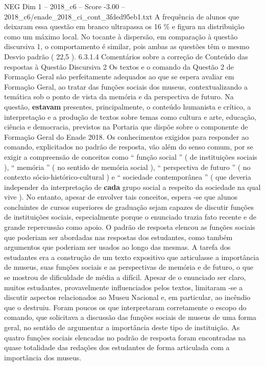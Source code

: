 \begin{textsample}{NEG Dim 1 – 2018\_c6 – Score -3.00 – 2018\_c6/enade\_2018\_ci\_cont\_3fded95eb1.txt}
A frequência de alunos que deixaram essa questão em branco ultrapassa os 16 \% e figura na distribuição como um máximo local.
No tocante à dispersão, em comparação à questão discursiva 1, o comportamento é similar, pois ambas as questões têm o mesmo Desvio padrão ( 22,5 ). 6.3.1.4 Comentários sobre a correção de Conteúdo das respostas à Questão Discursiva 2 Os textos e o comando da Questão 2 de Formação Geral são perfeitamente adequados ao que se espera avaliar em Formação Geral, ao tratar das funções sociais dos museus, contextualizando a temática sob o ponto de vista da memória e da perspectiva de futuro.
Na questão, \textbf{estavam} presentes, principalmente, o conteúdo humanista e crítico, a interpretação e a produção de textos sobre temas como cultura e arte, educação, ciência e democracia, previstos na Portaria que dispõe sobre o componente de Formação Geral do Enade 2018.
Os conhecimentos exigidos para responder ao comando, explicitados no padrão de resposta, vão além do senso comum, por se exigir a compreensão de conceitos como “ função social ” ( de instituições sociais ), “ memória ” ( no sentido de memória social ), “ perspectiva de futuro ” ( no contexto sócio-histórico-cultural ) e “ sociedade contemporânea ” ( que deveria independer da interpretação de \textbf{cada} grupo social a respeito da sociedade na qual vive ).
No entanto, apesar de envolver tais conceitos, espera -se que alunos concluintes de cursos superiores de graduação sejam capazes de discutir funções de instituições sociais, especialmente porque o enunciado trazia fato recente e de grande repercussão como apoio.
O padrão de resposta elencou as funções sociais que poderiam ser abordadas nas respostas dos estudantes, como também argumentos que poderiam ser usados ao longo das mesmas.
A tarefa dos estudantes era a construção de um texto expositivo que articulasse a importância de museus, suas funções sociais e as perspectivas de memória e de futuro, o que se mostrou de dificuldade de média a difícil.
Apesar de o enunciado ser claro, muitos estudantes, provavelmente influenciados pelos textos, limitaram -se a discutir aspectos relacionados ao Museu Nacional e, em particular, ao incêndio que o destruiu.
Foram poucos os que interpretaram corretamente o escopo do comando, que solicitava a discussão das funções sociais de museus de uma forma geral, no sentido de argumentar a importância deste tipo de instituição.
As quatro funções sociais elencadas no padrão de resposta foram encontradas na quase totalidade das redações dos estudantes de forma articulada com a importância dos museus.

\end{textsample}
